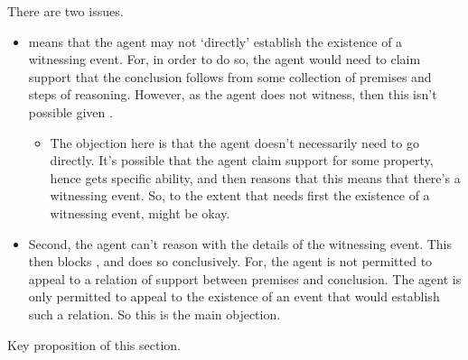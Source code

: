 \begin{note}
  \color{red}
  There are two issues.
  \begin{itemize}
  \item \ESU{} means that the agent may not `directly' establish the existence of a witnessing event.
    For, in order to do so, the agent would need to claim support that the conclusion follows from some collection of premises and steps of reasoning.
    However, as the agent does not witness, then this isn't possible given \ESU{}.
    \begin{itemize}
    \item The objection here is that the agent doesn't necessarily need to go directly.
      It's possible that the agent claim support for some property, hence gets specific ability, and then reasons that this means that there's a witnessing event.
      So, to the extent that \WR{} needs first the existence of a witnessing event, \ESU{} might be okay.
    \end{itemize}
  \item Second, the agent can't reason with the details of the witnessing event.
    This then blocks \WR{}, and does so conclusively.
    For, the agent is not permitted to appeal to a relation of support between premises and conclusion.
    The agent is only permitted to appeal to the existence of an event that would establish such a relation.
    So this is the main objection.
  \end{itemize}
\end{note}

Key proposition of this section.

